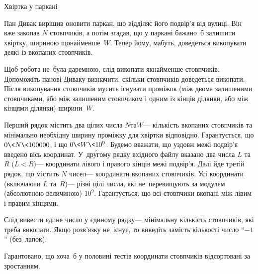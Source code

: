 ﻿\begin{problemAllDefault}{Хвіртка у паркані}

Пан Дивак вирішив оновити паркан, що відділяє його подвір'я від вулиці. Він вже закопав $N$ стовпчиків, а потім згадав, що у паркані бажано~б залишити хвіртку, шириною щонайменше~$W$. Тепер йому, мабуть, доведеться викопувати деякі із вкопаних стовпчиків.

Щоб робота не~була даремною, слід викопати якнайменше стовпчиків. Допоможіть панові Диваку визначити, скільки стовпчиків доведеться викопати. \mbox{Після} викопування стовпчиків мусить існувати проміжок (між двома залишеними стовпчиками, або між залишеним стовпчиком і одним із кінців ділянки, або між кінцями ділянки) ширини$\,{\>}\,W$.

\InputFile
Перший рядок містить два цілих числа $N$\nolinebreak[2] та\nolinebreak[2] $W$\nolinebreak[3] --- кількість вкопаних стовпчиків та мінімально необхідну ширину проміжку для хвіртки відповідно. Гарантується, що $0{\<}N{\<}100000$, і що $0{\<}W{\<} 10^9$.
Будемо вважати, що уздовж межі подвір'я введено вісь координат. У~др\'{у}гому рядку вхідного файлу вказано два числа $L$ та\nolinebreak[2] $R$ ($L{<}R$)\nolinebreak[3] --- координати лівого і правого кінців межі подвір'я. Далі йде третій рядок, що містить $N$ чисел\nolinebreak[3] --- координати вкопаних стовпчиків. Усі координати (включаючи $L$ та~$R$)\nolinebreak[3] --- різні цілі числа, які не~перевищують за модулем (абсолютною величиною) $10^9$. Гарантується, що всі стовпчики вкопані між лівим і правим кінцями.

\OutputFile
Слід вивести єдине число у єдиному рядку\nolinebreak[3] --- мінімальну кількість стовпчиків, які треба викопати. Якщо розв'язку не~існує, то виведіть замість кількості число ``$-1$'' (без~лапок).

\Examples
\noindent\begin{exampleSimple}{10em}{7em}
%
%
%
\end{exampleSimple}

\Note
Гарантовано, що хоча~б у половині тестів координати стовпчиків відсортовані за зростанням.

\end{problemAllDefault}
